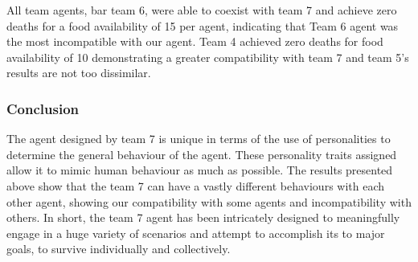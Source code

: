 All team agents, bar team 6, were able to coexist with team 7 and achieve zero deaths for a food availability of 15 per agent, indicating that Team 6 agent was the most incompatible with our agent. Team 4 achieved zero deaths for food availability of 10 demonstrating a greater compatibility with team 7 and team 5's results are not too dissimilar.  

\subsubsection{Conclusion}
The agent designed by team 7 is unique in terms of the use of personalities to determine the general behaviour of the agent. These personality traits assigned allow it to mimic human behaviour as much as possible. The results presented above show that the team 7 can have a vastly different behaviours with each other agent, showing our compatibility with some agents and incompatibility with others. In short, the team 7 agent has been intricately designed to meaningfully engage in a huge variety of scenarios and attempt to accomplish its to major goals, to survive individually and collectively.